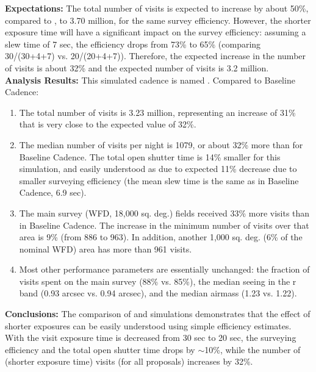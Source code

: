 {\bf Expectations:} The total number of visits is expected to increase
by about 50\%, compared to , to 3.70 million,
for the same survey efficiency. However, the shorter exposure time
will have a significant impact on the survey efficiency: assuming a
slew time of 7 sec, the efficiency drops from 73\% to 65\% (comparing
30/(30+4+7) vs. 20/(20+4+7)). Therefore, the expected increase in the
number of visits is about 32\% and the expected number of visits is
3.2 million.  \\

{\bf Analysis Results:}  This simulated cadence is named
. Compared to Baseline Cadence:
\begin{enumerate}
\item The total number of visits is 3.23 million, representing an
increase of 31\% that is very close to the expected value of 32\%.
\item The median number of visits per night is 1079, or about 32\%
more than for Baseline Cadence. The total open shutter time is 14\%
smaller for this simulation, and easily understood as due to expected
11\% decrease due to smaller surveying efficiency (the mean slew time
is the same as in Baseline Cadence, 6.9 sec).
\item The main survey (WFD, 18,000 sq. deg.) fields received 33\% more
visits than in Baseline Cadence. The increase in the minimum number of
visits over that area is 9\% (from 886 to 963). In addition, another
1,000 sq. deg. (6\% of the nominal WFD) area has more than 961 visits.
\item Most other performance parameters are essentially unchanged: the
fraction of visits spent on the main survey (88\% vs. 85\%), the
median seeing in the r band (0.93 arcsec vs. 0.94 arcsec), and the
median airmass (1.23 vs. 1.22).
\end{enumerate}

{\bf Conclusions:}
The comparison of  and
 simulations demonstrates that the effect of
shorter exposures can be easily understood using simple efficiency
estimates. With the visit exposure time is decreased from 30 sec to 20
sec, the surveying efficiency and the total open shutter time drops by
$\sim$10\%, while the number of (shorter exposure time) visits (for
all proposals) increases by 32\%.




